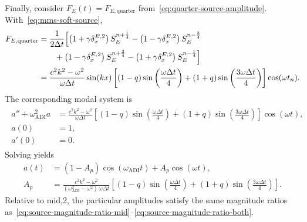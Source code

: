 \documentclass{article}
\numberwithin{figure}{section}
\begin{document}
Finally, consider $F_E(t)=F_{E,\mathrm{quarter}}$ from~\eqref{eq:quarter-source-amplitude}.
With~\eqref{eq:mms-soft-source},
\begin{align}
    \begin{split}
        F_{E,\mathrm{quarter}}
         & =\frac{1}{2\Delta t}\Bigl[
        \left(1+\gamma\delta_x^{E,2}\right)S_E^{n+\frac{1}{4}}
        -\left(1-\gamma\delta_x^{E,2}\right)S_E^{n-\frac{3}{4}}    \\
         & \qquad
        +\left(1-\gamma\delta_x^{E,2}\right)S_E^{n+\frac{3}{4}}
        -\left(1+\gamma\delta_x^{E,2}\right)S_E^{n-\frac{1}{4}}
        \Bigr]                                                   \\
         & =\frac{c^2k^2-\omega^2}{\omega\Delta t}\sin(kx)\left[
            (1-q)\sin\left(\frac{\omega\Delta t}{4}\right)
            +(1+q)\sin\left(\frac{3\omega\Delta t}{4}\right)
            \right]\cos(\omega t_n).
    \end{split}
    \label{eq:mms-F-quarter-real}
\end{align}
The corresponding modal system is
\begin{align}
    \begin{split}
        a''+\omega_{\mathrm{ADI}}^2 a
         & =\frac{c^2k^2-\omega^2}{\omega\Delta t}\left[
            (1-q)\sin\left(\frac{\omega\Delta t}{4}\right)
            +(1+q)\sin\left(\frac{3\omega\Delta t}{4}\right)
        \right]\cos(\omega t),                           \\
        a(0)
         & =1,                                           \\
        a'(0)
         & =0.
    \end{split}
    \label{eq:mms-forced-quarter}
\end{align}
Solving yields
\begin{equation}
    \begin{aligned}
        a(t)
         & =\left(1-A_p\right)\cos(\omega_{\mathrm{ADI}}t)+A_p\cos(\omega t),                \\
        A_p
         & =\frac{c^2k^2-\omega^2}{(\omega_{\mathrm{ADI}}^2-\omega^2)\,\omega\Delta t}\left[
            (1-q)\sin\left(\frac{\omega\Delta t}{4}\right)
            +(1+q)\sin\left(\frac{3\omega\Delta t}{4}\right)
            \right].
    \end{aligned}
    \label{eq:mms-solution-quarter}
\end{equation}
Relative to mid,2, the particular amplitudes satisfy the same magnitude ratios as~\eqref{eq:source-magnitude-ratio-mid}--\eqref{eq:source-magnitude-ratio-both}.
\end{document}
